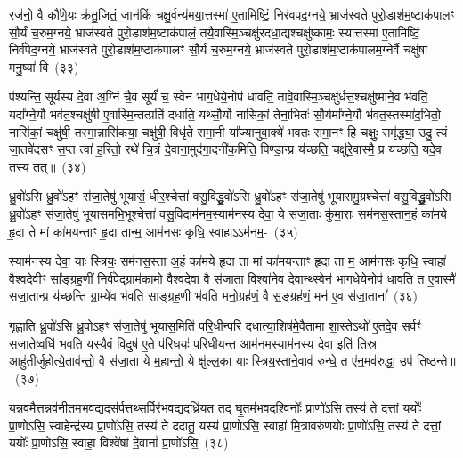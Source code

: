 {\anuvakamend[{इ॒न्द्रि॒यका॑मः सवि॒तुस्तेज॒स्तत्पु॑रो॒डाशो॒\-ऽष्टात्रिꣳ॑शच्च}]}

रज॑नो॒ वै कौ॑णे॒यः क्र॑तु॒जितं॒ जान॑किं चक्षु॒र्वन्य॑मया॒त्तस्मा॑ ए॒तामिष्टिं॒ निर॑वपद॒ग्नये॒ भ्राज॑स्वते पुरो॒डाश॑\-म॒ष्टाक॑पालꣳ सौ॒र्यं च॒रुम॒ग्नये॒ भ्राज॑स्वते पुरो॒डाश॑\-म॒ष्टाक॑पालं॒ तयै॒वास्मि॒ञ्चक्षु॑\-र\-दधा॒द्यश्चक्षु॑ष्कामः॒ स्यात्तस्मा॑ ए॒तामिष्टिं॒ निर्व॑पेद॒ग्नये॒ भ्राज॑स्वते पुरो॒डाश॑\-म॒ष्टाक॑पालꣳ सौ॒र्यं च॒रुम॒ग्नये॒ भ्राज॑स्वते पुरो॒डाश॑\-म॒ष्टाक॑पालम॒ग्नेर्वै चक्षु॑षा मनु॒ष्या॑ वि~(३३)\ip

प॑श्यन्ति॒ सूर्य॑स्य दे॒वा अ॒ग्निं चै॒व सूर्यं॑ च॒ स्वेन॑ भाग॒\-धेये॒नोप॑ धावति॒ तावे॒वास्मि॒ञ्चक्षु॑र्धत्त॒श्चक्षु॑ष्माने॒व भ॑वति॒ यदा᳚ग्ने॒यौ भव॑त॒श्चक्षु॑षी ए॒वास्मि॒न्तत्प्रति॑ दधाति॒ यथ्सौ॒र्यो नासि॑कां॒ तेना॒भितः॑ सौ॒र्यमा᳚ग्ने॒यौ भ॑वत॒स्तस्मा॑द॒भितो॒ नासि॑कां॒ चक्षु॑षी॒ तस्मा॒न्नासि॑कया॒ चक्षु॑षी॒ विधृ॑ते समा॒नी या᳚ज्यानुवा॒क्ये॑ भवतः समा॒नꣳ हि चक्षुः॒ समृ॑द्ध्या॒ उदु॒ त्यं जा॒तवे॑दसꣳ स॒प्त त्वा॑ ह॒रितो॒ रथे॑ चि॒त्रं दे॒वाना॒मुद॑गा॒दनी॑क॒मिति॒ पिण्डा॒न्प्र य॑च्छति॒ चक्षु॑रे॒वास्मै॒ प्र य॑च्छति॒ यदे॒व तस्य॒ तत्॥~(३४)\ip

{\anuvakamend[{वि ह्य॑ष्टाविꣳ॑शतिश्च}]}

ध्रु॒वो॑\-ऽसि ध्रु॒वो॑\-ऽहꣳ स॑जा॒तेषु॑ भूयासं॒ धीर॒श्चेत्ता॑ वसु॒विद्ध्रु॒वो॑\-ऽसि ध्रु॒वो॑\-ऽहꣳ स॑जा॒तेषु॑ भूयासमु॒ग्रश्चेत्ता॑ वसु॒विद्ध्रु॒वो॑\-ऽसि ध्रु॒वो॑\-ऽहꣳ स॑जा॒तेषु॑ भूयासमभि॒भूश्चेत्ता॑ वसु॒विदाम॑नम॒स्याम॑नस्य देवा॒ ये स॑जा॒ताः कु॑मा॒राः सम॑नस॒स्तान॒हं का॑मये हृ॒दा ते मां का॑मयन्ताꣳ हृ॒दा तान्म॒ आम॑नसः कृधि॒ स्वाहा\-ऽऽ\-म॑नम॒-~(३५)\ip

स्याम॑नस्य देवा॒ याः स्त्रियः॒ सम॑नस॒स्ता अ॒हं का॑मये हृ॒दा ता मां का॑मयन्ताꣳ हृ॒दा ता म॒ आम॑नसः कृधि॒ स्वाहा॑ वैश्वदे॒वीꣳ सा᳚ङ्ग्रह॒णीं निर्व॑पे॒द्ग्राम॑कामो वैश्वदे॒वा वै स॑जा॒ता विश्वा॑ने॒व दे॒वान्थ्स्वेन॑ भाग॒\-धेये॒नोप॑ धावति॒ त ए॒वास्मै॑ सजा॒तान्प्र य॑च्छन्ति ग्रा॒म्ये॑व भ॑वति साङ्ग्रह॒णी भ॑वति मनो॒ग्रह॑णं॒ वै स॒ङ्ग्रह॑णं॒ मन॑ ए॒व स॑जा॒तानां᳚~(३६)\ip

गृह्णाति ध्रु॒वो॑\-ऽसि ध्रु॒वो॑\-ऽहꣳ स॑जा॒तेषु॑ भूयास॒मिति॑ परि॒धीन्परि॑ दधात्या॒शिष॑मे॒वैतामा शा॒स्ते\-ऽथो॑ ए॒तदे॒व सर्वꣳ॑ सजा॒तेष्वधि॑ भवति॒ यस्यै॒वं वि॒दुष॑ ए॒ते प॑रि॒धयः॑ परिधी॒यन्त॒ आम॑नम॒स्याम॑नस्य देवा॒ इति॑ ति॒स्र आहु॑तीर्जुहोत्ये॒ताव॑न्तो॒ वै स॑जा॒ता ये म॒हान्तो॒ ये क्षु॑ल्ल॒का याः स्त्रिय॒स्ताने॒वाव॑ रुन्धे॒ त ए॑न॒मव॑रुद्धा॒ उप॑ तिष्ठन्ते॥~(३७)\ip

{\anuvakamend[{स्वाहाम॑नमसि सजा॒तानाꣳ॑ रुन्धे॒ पञ्च॑ च}]}

यन्नव॒मैत्तन्नव॑नीतमभव॒द्यदस॑र्प॒त्तथ्स॒र्पिर॑भव॒द्यदध्रि॑यत॒ तद् घृ॒तम॑\-भव\-द॒श्विनोः᳚ प्रा॒णो॑\-ऽसि॒ तस्य॑ ते दत्तां॒ ययोः᳚ प्रा॒णो\-ऽसि॒ स्वाहेन्द्र॑स्य प्रा॒णो॑\-ऽसि॒ तस्य॑ ते ददातु॒ यस्य॑ प्रा॒णो\-ऽसि॒ स्वाहा॑ मि॒त्रावरु॑णयोः प्रा॒णो॑\-ऽसि॒ तस्य॑ ते दत्तां॒ ययोः᳚ प्रा॒णो\-ऽसि॒ स्वाहा॒ विश्वे॑षां दे॒वानां᳚ प्रा॒णो॑\-ऽसि॒~(३८)\ip

